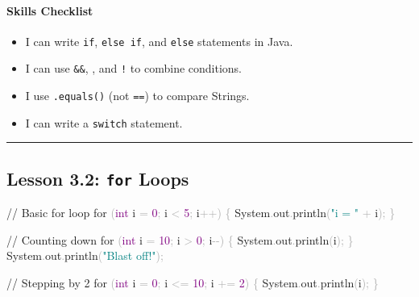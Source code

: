 \documentclass[
  justified,
  openright,
]{tufte-book}
\let\subsubsection\paragraph
\let\paragraph\paragraph
\newcommand{\BuiltInTok}[1]{#1}
\newcommand{\CommentTok}[1]{\textcolor{MidGray}{#1}}
\newcommand{\ControlFlowTok}[1]{\textcolor{BrandBlue}{#1}}
\newcommand{\DataTypeTok}[1]{\textcolor{Purple}{#1}}
\newcommand{\DecValTok}[1]{\textcolor{Purple}{#1}}
\newcommand{\FunctionTok}[1]{\textcolor{BrandBlue}{#1}}
\newcommand{\NormalTok}[1]{#1}
\newcommand{\OperatorTok}[1]{\textcolor{DarkGray}{#1}}
\newcommand{\StringTok}[1]{\textcolor{Teal}{#1}}
\newenvironment{Shaded}{%
  \begin{snugshade}
}{%
  \end{snugshade}
}
\let\subsubsection\paragraph
\let\paragraph\paragraph
\providecommand{\tightlist}{%
  \setlength{\itemsep}{0pt}\setlength{\parskip}{0pt}}
\begin{document}
\subsubsection{Skills Checklist}\label{skills-checklist-7}

\begin{itemize}
\tightlist
\item[$\square$]
  I can write \texttt{if}, \texttt{else\ if}, and \texttt{else}
  statements in Java.
\item[$\square$]
  I can use \texttt{\&\&}, \texttt{\textbar{}\textbar{}}, and \texttt{!}
  to combine conditions.
\item[$\square$]
  I use \texttt{.equals()} (not \texttt{==}) to compare Strings.
\item[$\square$]
  I can write a \texttt{switch} statement.
\end{itemize}

\begin{center}\rule{0.5\linewidth}{0.5pt}\end{center}

\subsection{\texorpdfstring{Lesson 3.2: \texttt{for}
Loops}{Lesson 3.2: for Loops}}\label{lesson-3.2-for-loops}

\begin{Shaded}
\begin{Highlighting}[]
\CommentTok{// Basic for loop}
\ControlFlowTok{for} \OperatorTok{(}\DataTypeTok{int}\NormalTok{ i }\OperatorTok{=} \DecValTok{0}\OperatorTok{;}\NormalTok{ i }\OperatorTok{\textless{}} \DecValTok{5}\OperatorTok{;}\NormalTok{ i}\OperatorTok{++)} \OperatorTok{\{}
    \BuiltInTok{System}\OperatorTok{.}\FunctionTok{out}\OperatorTok{.}\FunctionTok{println}\OperatorTok{(}\StringTok{"i = "} \OperatorTok{+}\NormalTok{ i}\OperatorTok{);}
\OperatorTok{\}}

\CommentTok{// Counting down}
\ControlFlowTok{for} \OperatorTok{(}\DataTypeTok{int}\NormalTok{ i }\OperatorTok{=} \DecValTok{10}\OperatorTok{;}\NormalTok{ i }\OperatorTok{\textgreater{}} \DecValTok{0}\OperatorTok{;}\NormalTok{ i}\OperatorTok{{-}{-})} \OperatorTok{\{}
    \BuiltInTok{System}\OperatorTok{.}\FunctionTok{out}\OperatorTok{.}\FunctionTok{println}\OperatorTok{(}\NormalTok{i}\OperatorTok{);}
\OperatorTok{\}}
\BuiltInTok{System}\OperatorTok{.}\FunctionTok{out}\OperatorTok{.}\FunctionTok{println}\OperatorTok{(}\StringTok{"Blast off!"}\OperatorTok{);}

\CommentTok{// Stepping by 2}
\ControlFlowTok{for} \OperatorTok{(}\DataTypeTok{int}\NormalTok{ i }\OperatorTok{=} \DecValTok{0}\OperatorTok{;}\NormalTok{ i }\OperatorTok{\textless{}=} \DecValTok{10}\OperatorTok{;}\NormalTok{ i }\OperatorTok{+=} \DecValTok{2}\OperatorTok{)} \OperatorTok{\{}
    \BuiltInTok{System}\OperatorTok{.}\FunctionTok{out}\OperatorTok{.}\FunctionTok{println}\OperatorTok{(}\NormalTok{i}\OperatorTok{);}
\OperatorTok{\}}
\end{Highlighting}
\end{Shaded}
\end{document}
